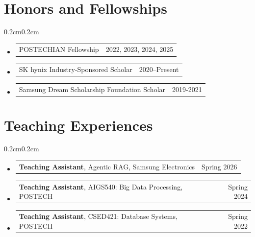 \documentclass[10pt, letterpaper]{article}
\newenvironment{onecolentry}{
    \begin{adjustwidth}{0.2cm}{0.2cm}
}{
    \end{adjustwidth}
}
\begin{document}
\section{Honors and Fellowships}
\begin{onecolentry}
\begin{itemize}[leftmargin=0.4cm]

    \item
    \begin{tabularx}{0.97\textwidth}{X r}
        POSTECHIAN Fellowship & 2022, 2023, 2024, 2025
    \end{tabularx}

    \item
    \begin{tabularx}{0.97\textwidth}{X r}
        SK hynix Industry-Sponsored Scholar & 2020--Present
    \end{tabularx}

    \item
    \begin{tabularx}{0.97\textwidth}{X r}
        Samsung Dream Scholarship Foundation Scholar & 2019-2021
    \end{tabularx}

\end{itemize}
\end{onecolentry}

\section{Teaching Experiences}
\begin{onecolentry}
\begin{itemize}[leftmargin=0.4cm]

    \item
    \begin{tabularx}{0.97\textwidth}{X r}
        \textbf{Teaching Assistant}, Agentic RAG, Samsung Electronics & Spring 2026
    \end{tabularx}

    \item
    \begin{tabularx}{0.97\textwidth}{X r}
        \textbf{Teaching Assistant}, AIGS540: Big Data Processing, POSTECH & Spring 2024
    \end{tabularx}

    \item
    \begin{tabularx}{0.97\textwidth}{X r}
        \textbf{Teaching Assistant}, CSED421: Database Systems, POSTECH & Spring 2022
    \end{tabularx}

\end{itemize}
\end{onecolentry}
\end{document}
